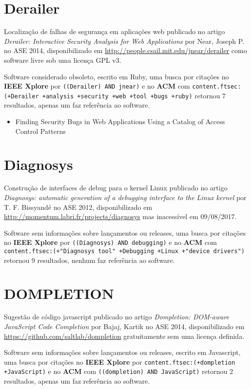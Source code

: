\section{Derailer}

Localização de falhas de segurança em aplicações web
publicado no artigo {\it Derailer: Interactive Security Analysis for Web Applications}
por Near, Joseph P.
no ASE 2014,
disponibilizado em \url{http://people.csail.mit.edu/jnear/derailer}
como software livre
sob uma licença GPL v3.

Software considerado obsoleto,
escrito em Ruby,
uma busca por citações no {\bf IEEE Xplore} por
\texttt{((Derailer) AND jnear)}
e no {\bf ACM} com
\texttt{content.ftsec:(+Derailer +analysis +security +web +tool +bugs +ruby)}
retornou
7 resultados,
apenas um faz referência ao software.

\begin{itemize}
\item Finding Security Bugs in Web Applications Using a Catalog of Access Control Patterns
\end{itemize}


\section{Diagnosys}

Construção de interfaces de debug para o kernel Linux
publicado no artigo {\it Diagnosys: automatic generation of a debugging interface to the Linux kernel}
por T. F. Bissyandé
no ASE 2012,
disponibilizado em \url{http://momentum.labri.fr/projects/diagnosys}
mas inacessível em 09/08/2017.

Software sem informações sobre lançamentos ou releases,
uma busca por citações no {\bf IEEE Xplore} por
\texttt{((Diagnosys) AND debugging)}
e no {\bf ACM} com
\texttt{content.ftsec:(+"Diagnosys tool" +Debugging +Linux +"device drivers")}
retornou
9 resultados,
nenhum faz referência ao software.



\section{DOMPLETION}

Sugestão de código javascript
publicado no artigo {\it Dompletion: DOM-aware JavaScript Code Completion}
por Bajaj, Kartik
no ASE 2014,
disponibilizado em \url{https://github.com/saltlab/dompletion}
gratuitamente
sem uma licença definida.

Software sem informações sobre lançamentos ou releases,
escrito em Javascript,
uma busca por citações no {\bf IEEE Xplore} por
\texttt{content.ftsec:(+dompletion +JavaScript)}
e no {\bf ACM} com
\texttt{((dompletion) AND JavaScript)}
retornou
2 resultados,
apenas um faz referência ao software.

